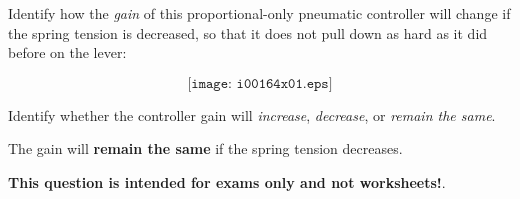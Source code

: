 

Identify how the {\it gain} of this proportional-only pneumatic controller will change if the spring tension is decreased, so that it does not pull down as hard as it did before on the lever:

$$\texttt{[image: i00164x01.eps]}$$

Identify whether the controller gain will {\it increase}, {\it decrease}, or {\it remain the same}.

\vskip 30pt







The gain will {\bf remain the same} if the spring tension decreases.







{\bf This question is intended for exams only and not worksheets!}.



